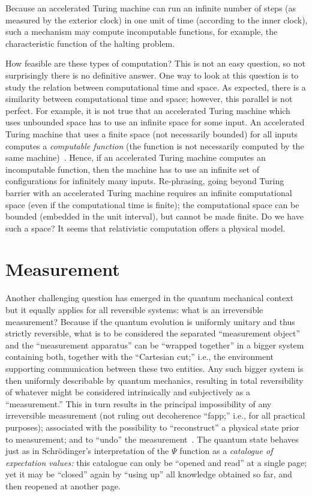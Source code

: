\documentclass[11pt, pra,amsfonts,showpacs,showkeys]{revtex4}%
\begin{document}
Because an accelerated Turing machine can run an infinite number of steps
 (as measured by the exterior clock)
in one unit of time (according to the inner clock),
such a mechanism  may compute incomputable functions, for example, the characteristic function of
the halting problem.


How feasible are these
types of computation? This is not an easy question,
so not surprisingly  there is no definitive answer.
One way to look at this question is to study the relation between
 computational time and space. As expected, there is a similarity between computational time and space; however, this
parallel is not perfect. For example, it is not true that an accelerated
Turing machine which uses unbounded space has to use an infinite space for
some input. An accelerated Turing machine that uses a finite space (not necessarily bounded)
for all inputs  computes a  {\it computable function} (the function is not
   necessarily computed by the same machine)~\cite{calude-staiger-09}. Hence, if an accelerated Turing machine
   computes an incomputable function, then the machine has to use an infinite set of configurations  for infinitely many inputs. Re-phrasing, going beyond Turing barrier with an accelerated Turing machine requires an infinite computational space (even if the computational time is finite); the computational space can be bounded (embedded in the unit interval), but cannot be made finite. Do we have such a space? It seems that
   relativistic computation offers a
physical model.



\section{Measurement}


Another challenging question has emerged in the quantum mechanical context
but it equally applies for all reversible systems:
what is an irreversible measurement?
Because if  the quantum evolution is uniformly unitary and thus strictly reversible,
what is to be considered the separated ``measurement object'' and the ``measurement apparatus''
can be ``wrapped  together'' in a bigger system containing both, together with the ``Cartesian cut;'' i.e., the environment supporting communication between these two entities.
Any such bigger system is then uniformly describable by quantum mechanics, resulting in total reversibility of whatever
might be considered intrinsically and subjectively as a ``measurement.''
This in turn results in the principal impossibility of any irreversible measurement
(not ruling out  decoherence ``fapp;'' i.e., for all practical purposes);
associated with the possibility to ``reconstruct'' a physical state prior to measurement;
and to ``undo'' the measurement~\cite{hkwz}.
The quantum state behaves just as in Schr\"odinger's interpretation of the $\Psi$ function  as
a {\em catalogue of expectation values:} this catalogue can only be ``opened and read'' at a single page;
yet it may be ``closed'' again by ``using up'' all knowledge obtained so far, and then reopened at another page.
\end{document}
